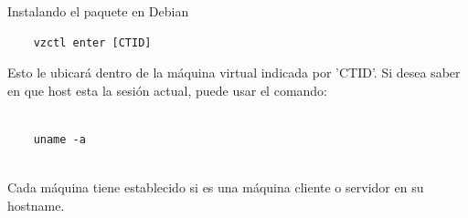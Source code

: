 \begin{frame}{Instalando el paquete en Debian}
\begin{verbatim}
    vzctl enter [CTID]

\end{verbatim}

    Esto le ubicará dentro de la máquina virtual indicada por 'CTID'.
    Si desea saber en que host esta la sesión actual, puede usar el
    comando:\\[0.2cm]

\begin{verbatim}

    uname -a
    
\end{verbatim}

    Cada máquina tiene establecido si es una máquina cliente o servidor en su
    hostname.

\end{frame}
    

